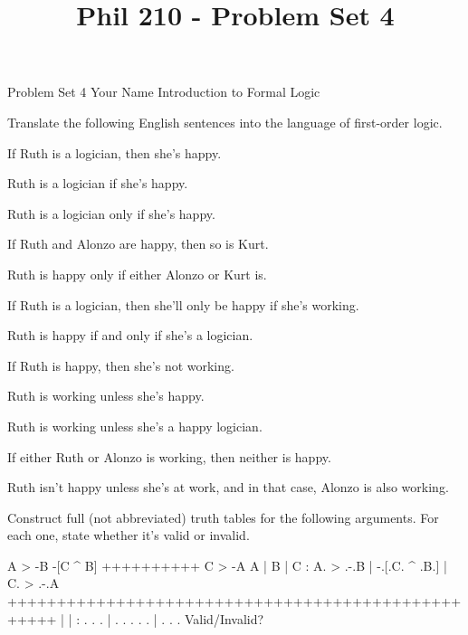 
\title{Phil 210 - Problem Set 4}

\heading
Problem Set 4
Your Name
Introduction to Formal Logic
\endheading

Translate the following English sentences into the language of first-order logic.

\problems
{}
If Ruth is a logician, then she's happy.
        \answer
        $ $
        \endanswer

Ruth is a logician if she's happy.
        \answer
        $ $
        \endanswer

Ruth is a logician only if she's happy.
        \answer
        $ $
        \endanswer

If Ruth and Alonzo are happy, then so is Kurt.
        \answer
        $ $
        \endanswer

Ruth is happy only if either Alonzo or Kurt is.
        \answer
        $ $
        \endanswer

If Ruth is a logician, then she'll only be happy if she's working.
        \answer
        $ $
        \endanswer

Ruth is happy if and only if she's a logician.
        \answer
        $ $
        \endanswer

If Ruth is happy, then she's not working.
        \answer
        $ $
        \endanswer

Ruth is working unless she's happy.
        \answer
        $ $
        \endanswer

Ruth is working unless she's a happy logician.
        \answer
        $ $
        \endanswer

If either Ruth or Alonzo is working, then neither is happy.
        \answer
        $ $
        \endanswer

Ruth isn't happy unless she's at work, and in that case, Alonzo is also working.
        \answer
        $ $
        \endanswer

\endproblems

Construct full (not abbreviated) truth tables for the following arguments. For each one, state whether it's valid or invalid.

\problems
{}
\argument
 A > -B
 -[C ^ B]
++++++++++
 C > -A
\endargument
        \answer
        \truthtable
         A | B | C : A. > .-.B | -.[.C. ^ .B.] | C. > .-.A
        +++++++++++++++++++++++++++++++++++++++++++++++++++
           |   |   :  .   . .  |  . . .   . .  |  .   . . 
        \endtruthtable
        Valid/Invalid?
        \endanswer

